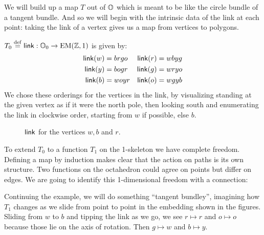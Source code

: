 We will build up a map \( T \) out of \( \mathbb{O} \) which is meant to be like the circle bundle of a tangent bundle. And so we will begin with the intrinsic data of the link at each point: taking the link of a vertex gives us a map from vertices to polygons.

\begin{mydef}
\( T_0\stackrel{\mathrm{def}}{=}\operatorname{\mathsf{link}}:\mathbb{O}_0\to\mathrm{EM}(\mathbb{Z},1) \) is given by:
\begin{align*}
\operatorname{\mathsf{link}}(w) &= brgo & \operatorname{\mathsf{link}}(r) &= wbyg \\
\operatorname{\mathsf{link}}(y) &= bogr & \operatorname{\mathsf{link}}(g) &= wryo \\
\operatorname{\mathsf{link}}(b) &= woyr & \operatorname{\mathsf{link}}(o) &= wgyb
\end{align*}
We chose these orderings for the vertices in the link, by visualizing standing at the given vertex as if it were the north pole, then looking south and enumerating the link in clockwise order, starting from \( w \) if possible, else \( b \).
\end{mydef}

\begin{figure}[h]
\centering

\caption{\( \operatorname{\mathsf{link}} \) for the vertices \( w, b\) and \( r \).}
\label{fig:triangle_of_equators}
\end{figure}

To extend \( T_0 \) to a function \( T_1 \) on the 1-skeleton we have complete freedom. Defining a map by induction makes clear that the action on paths is its own structure. Two functions on the octahedron could agree on points but differ on edges. We are going to identify this 1-dimensional freedom with a connection:

Continuing the example, we will do something ``tangent bundley'', imagining how \( T_1 \) changes as we slide from point to point in the embedding shown in the figures. Sliding from \( w \) to \( b \) and tipping the link as we go, we see \( r\mapsto r \) and \( o\mapsto o \) because those lie on the axis of rotation. Then \( g\mapsto w \) and \( b\mapsto y \). 

